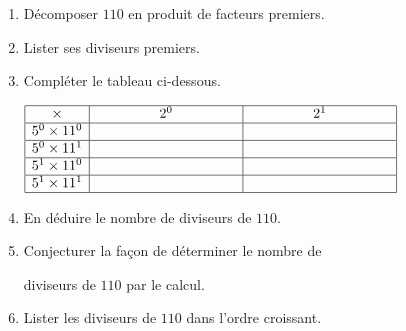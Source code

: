 \begin{exercice*}
    \begin{enumerate}
        \item Décomposer $110$ en produit de facteurs premiers.
        \item Lister ses diviseurs premiers.
        \item Compléter le tableau ci-dessous.
        
        \smallskip
        $\begin{array}{|c|c|c|}
        \hline
        \times & \phantom{plusLarge}2^{0}\phantom{plusLarge} & \phantom{plusLarge}2^{1}\phantom{plusLarge}\\
        \hline
        5^{0}\times11^{0} &  & \\
        \hline
        5^{0}\times11^{1} &  & \\
        \hline
        5^{1}\times11^{0} &  & \\
        \hline
        5^{1}\times11^{1} &  & \\
        \hline
        \end{array}$
        \smallskip
        \item En déduire le nombre de diviseurs de $110$.
        \item Conjecturer la façon de déterminer le nombre de
        
        diviseurs de $110$ par le calcul.
        \item Lister les diviseurs de $110$ dans l'ordre croissant.
    \end{enumerate}

\end{exercice*}
